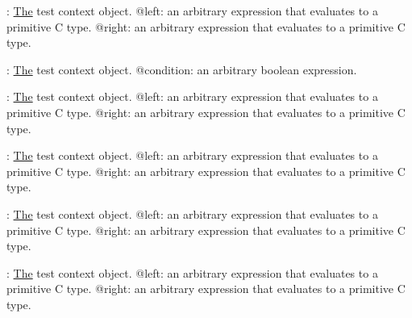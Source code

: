 \begin{DoxyRefList}
\item[Member \mbox{\hyperlink{test_8h_a33b68ed5bdccc54ce7d674ca82712e8c}{K\+U\+N\+I\+T\+\_\+\+A\+S\+S\+E\+R\+T\+\_\+\+EQ}} (test, left, right)]\label{test__test000054}%
%
\+: \mbox{\hyperlink{classThe}{The}} test context object. @left\+: an arbitrary expression that evaluates to a primitive C type. @right\+: an arbitrary expression that evaluates to a primitive C type. 
\item[Member \mbox{\hyperlink{test_8h_a35a33216f4b1eb2222c39d4aea98c512}{K\+U\+N\+I\+T\+\_\+\+A\+S\+S\+E\+R\+T\+\_\+\+F\+A\+L\+SE}} (test, condition)]\label{test__test000053}%
%
\+: \mbox{\hyperlink{classThe}{The}} test context object. @condition\+: an arbitrary boolean expression. 
\item[Member \mbox{\hyperlink{test_8h_a6b50df177aff066f8c47603c07255f16}{K\+U\+N\+I\+T\+\_\+\+A\+S\+S\+E\+R\+T\+\_\+\+GE}} (test, left, right)]\label{test__test000061}%
%
\+: \mbox{\hyperlink{classThe}{The}} test context object. @left\+: an arbitrary expression that evaluates to a primitive C type. @right\+: an arbitrary expression that evaluates to a primitive C type. 
\item[Member \mbox{\hyperlink{test_8h_a0ad0285c0e20979b7877d7b874b60b29}{K\+U\+N\+I\+T\+\_\+\+A\+S\+S\+E\+R\+T\+\_\+\+GT}} (test, left, right)]\label{test__test000060}%
%
\+: \mbox{\hyperlink{classThe}{The}} test context object. @left\+: an arbitrary expression that evaluates to a primitive C type. @right\+: an arbitrary expression that evaluates to a primitive C type. 
\item[Member \mbox{\hyperlink{test_8h_a38f6568cd5a73dd888c2ad561db7299c}{K\+U\+N\+I\+T\+\_\+\+A\+S\+S\+E\+R\+T\+\_\+\+LE}} (test, left, right)]\label{test__test000059}%
%
\+: \mbox{\hyperlink{classThe}{The}} test context object. @left\+: an arbitrary expression that evaluates to a primitive C type. @right\+: an arbitrary expression that evaluates to a primitive C type. 
\item[Member \mbox{\hyperlink{test_8h_ac6a80b15eaaea08e6e792c558ba0fc94}{K\+U\+N\+I\+T\+\_\+\+A\+S\+S\+E\+R\+T\+\_\+\+LT}} (test, left, right)]\label{test__test000058}%
%
\+: \mbox{\hyperlink{classThe}{The}} test context object. @left\+: an arbitrary expression that evaluates to a primitive C type. @right\+: an arbitrary expression that evaluates to a primitive C type. 
\item[Member \mbox{\hyperlink{test_8h_a317831ae6d7573c7d035534065ea483f}{K\+U\+N\+I\+T\+\_\+\+A\+S\+S\+E\+R\+T\+\_\+\+NE}} (test, left, right)]\label{test__test000056}%

\end{DoxyRefList}
